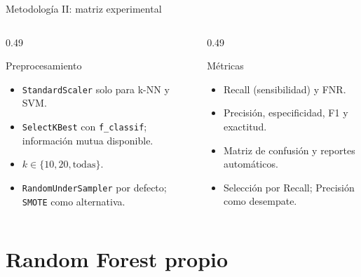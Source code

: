 \documentclass[aspectratio=169,11pt]{beamer}
\begin{document}
\begin{frame}{Metodología II: matriz experimental}
  \vspace{0.15cm}
  \begin{columns}[T]
    \begin{column}{0.49\textwidth}
      \begin{block}{Preprocesamiento}
        \scriptsize
        \begin{itemize}
          \item \texttt{StandardScaler} solo para k-NN y SVM.
          \item \texttt{SelectKBest} con \texttt{f\_classif}; información
                mutua disponible.
          \item \(k \in \{10,20,\text{todas}\}\).
          \item \texttt{RandomUnderSampler} por defecto; \texttt{SMOTE}
                como alternativa.
        \end{itemize}
      \end{block}
    \end{column}
    \begin{column}{0.49\textwidth}
      \begin{block}{Métricas}
        \scriptsize
        \begin{itemize}
          \item Recall (sensibilidad) y FNR.
          \item Precisión, especificidad, F1 y exactitud.
          \item Matriz de confusión y reportes automáticos.
          \item Selección por Recall; Precisión como desempate.
        \end{itemize}
      \end{block}
    \end{column}
  \end{columns}
\end{frame}

\section{Random Forest propio}
\end{document}
